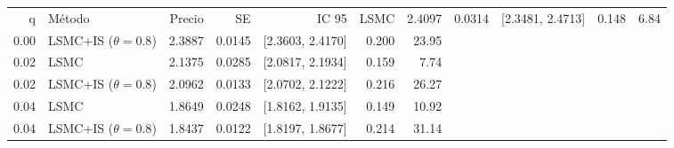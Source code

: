 \begin{tabular}{r p{3.6cm} r r r r r}
\toprule
q & Método & Precio & SE & IC 95%
 & LSMC & 2.4097 & 0.0314 & [2.3481, 2.4713] & 0.148 & 6.84 \\
0.00 & LSMC+IS ($\theta=0.8$) & 2.3887 & 0.0145 & [2.3603, 2.4170] & 0.200 & 23.95 \\
0.02 & LSMC & 2.1375 & 0.0285 & [2.0817, 2.1934] & 0.159 & 7.74 \\
0.02 & LSMC+IS ($\theta=0.8$) & 2.0962 & 0.0133 & [2.0702, 2.1222] & 0.216 & 26.27 \\
0.04 & LSMC & 1.8649 & 0.0248 & [1.8162, 1.9135] & 0.149 & 10.92 \\
0.04 & LSMC+IS ($\theta=0.8$) & 1.8437 & 0.0122 & [1.8197, 1.8677] & 0.214 & 31.14 \\
\bottomrule
\end{tabular}
